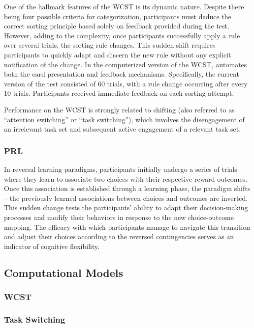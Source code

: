 \documentclass[
  man]{apa6}
\begin{document}
One of the hallmark features of the WCST is its dynamic nature. Despite there being four possible criteria for categorization, participants must deduce the correct sorting principle based solely on feedback provided during the test. However, adding to the complexity, once participants successfully apply a rule over several trials, the sorting rule changes. This sudden shift requires participants to quickly adapt and discern the new rule without any explicit notification of the change. In the computerized version of the WCST, automates both the card presentation and feedback mechanisms. Specifically, the current version of the test consisted of 60 trials, with a rule change occurring after every 10 trials. Participants received immediate feedback on each sorting attempt.

Performance on the WCST is strongly related to shifting (also referred to as ``attention switching'' or ``task switching''), which involves the disengagement of an irrelevant task set and subsequent active engagement of a relevant task set.

\subsubsection{PRL}\label{prl}

In reversal learning paradigms, participants initially undergo a series of trials where they learn to associate two choices with their respective reward outcomes. Once this association is established through a learning phase, the paradigm shifts -- the previously learned associations between choices and outcomes are inverted. This sudden change tests the participants' ability to adapt their decision-making processes and modify their behaviors in response to the new choice-outcome mapping. The efficacy with which participants manage to navigate this transition and adjust their choices according to the reversed contingencies serves as an indicator of cognitive flexibility.

\subsection{Computational Models}\label{computational-models}

\subsubsection{WCST}\label{wcst-1}

\subsubsection{Task Switching}\label{task-switching}
\end{document}
